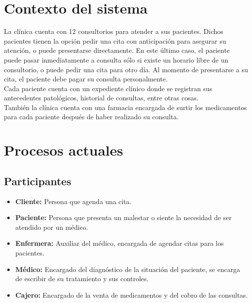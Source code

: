 \section{Contexto del sistema}
La clínica cuenta con 12 consultorios para atender a sus pacientes. Dichos pacientes tienen la opción pedir una cita con anticipación para asegurar su atención, o puede presentarse directamente. En este último caso, el paciente puede pasar inmediatamente a consulta sólo si existe un horario libre de un consultorio, o puede pedir una cita para otro día. Al momento de presentarse a su cita, el paciente debe pagar su consulta personalmente.\\

Cada paciente cuenta con un expediente clínico donde se registran sus antecedentes patológicos, historial de consultas, entre otras cosas.\\

También la clínica cuenta con una farmacia encargada de surtir los medicamentos para cada paciente después de haber realizado su consulta.\\


\section{Procesos actuales}


\subsection{Participantes}

\begin{itemize}
\item \textbf{Cliente: }Persona que agenda una cita.
\item \textbf{Paciente: }Persona que presenta un malestar o siente la necesidad de ser atendido por un médico.
\item \textbf{Enfermera: }Auxiliar del médico, encargada de agendar citas para los pacientes.
\item \textbf{Médico: }Encargado del diagnóstico de la situación del paciente, se encarga de escribir de su tratamiento y sus controles.
\item \textbf{Cajero: }Encargado de la venta de medicamentos y del cobro de las consultas.
\end{itemize}
\newpage


